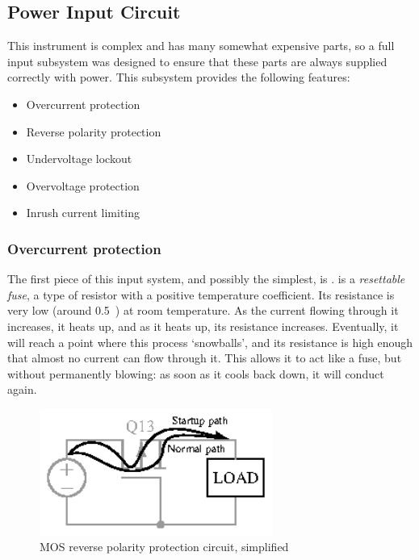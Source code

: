\subsection{Power Input Circuit}


This instrument is complex and has many somewhat expensive parts, so a full
input subsystem was designed to ensure that these parts are always supplied
correctly with power. This subsystem provides the following features:

\begin{itemize}
\item{Overcurrent protection}
\item{Reverse polarity protection}
\item{Undervoltage lockout}
\item{Overvoltage protection}
\item{Inrush current limiting}
\end{itemize}

\subsubsection{Overcurrent protection}

The first piece of this input system, and possibly the simplest, is
.  is a \emph{resettable fuse}, a type of resistor
with a positive temperature coefficient. Its resistance is very low
(around 0.5~\Ohm) at room temperature. As the current flowing through it
increases, it heats up, and as it heats up, its resistance increases.
Eventually, it will reach a point where this process `snowballs', and its
resistance is high enough that almost no current can flow through it. This
allows it to act like a fuse, but without permanently blowing: as soon as it
cools back down, it will conduct again.

\begin{figure}[H]
\centering
\includegraphics[width=3in]{mosrpp}
\caption{MOS reverse polarity protection circuit, simplified}
\label{fig:mosrpp}
\end{figure}

